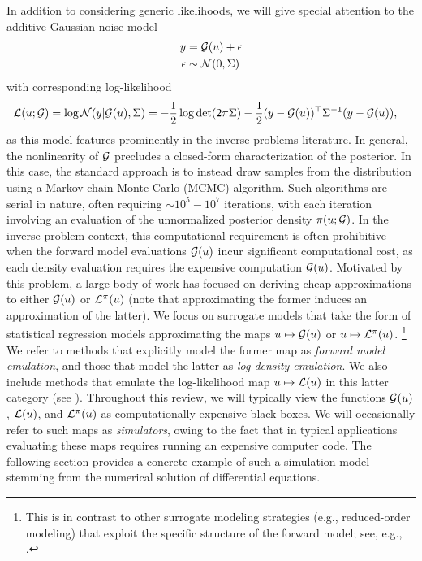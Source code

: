 \documentclass[12pt]{article}
\begin{document}
In addition to considering 
generic likelihoods, we will give special attention to the additive Gaussian noise model
\begin{align}
y &= \mathcal{G}(u) + \epsilon \label{inv_prob_Gaussian} \\
\epsilon &\sim \mathcal{N}(0, \Sigma) \nonumber 
\end{align}
with corresponding log-likelihood 
\begin{align}
\mathcal{L}(u; \mathcal{G}) &= \log\mathcal{N}(y| \mathcal{G}(u), \Sigma) 
= -\frac{1}{2} \log\det (2\pi \Sigma) - \frac{1}{2} (y - \mathcal{G}(u))^\top \Sigma^{-1} (y - \mathcal{G}(u)), \label{llik_Gaussian}
\end{align}
as this model features prominently in the inverse problems literature.
In general, the nonlinearity of $\mathcal{G}$ precludes a closed-form characterization of the posterior. In this case, the 
standard approach is to instead draw samples from the distribution using a Markov chain Monte Carlo (MCMC) 
algorithm. Such algorithms are serial in nature, often requiring $\sim 10^5 - 10^7$ iterations, with each 
iteration involving an evaluation of the unnormalized posterior density $\pi(u; \mathcal{G})$. 
In the inverse problem context, this computational requirement is often prohibitive when the forward model 
evaluations $\mathcal{G}(u)$ incur significant computational cost, as each density evaluation requires the 
expensive computation $\mathcal{G}(u)$. Motivated by this problem, a large body of work has focused on deriving 
cheap approximations to either $\mathcal{G}(u)$ or $\mathcal{L}^{\pi}(u)$ (note that approximating the former induces 
an approximation of the latter). We focus on surrogate models that take the form of statistical 
regression models approximating the maps $u \mapsto \mathcal{G}(u)$ or $u \mapsto \mathcal{L}^{\pi}(u)$.
\footnote{This is in contrast to other surrogate modeling strategies (e.g., reduced-order modeling)
that exploit the specific structure of the forward model; see, e.g., \todo.}
We refer to methods that explicitly model the former map as \textit{forward model emulation}, and those that 
model the latter as \textit{log-density emulation}. We also include methods that emulate the log-likelihood
map $u \mapsto \mathcal{L}(u)$ in this latter category (see ).
Throughout this review, we will typically view the functions
$\mathcal{G}(u)$, $\mathcal{L}(u)$, and $\mathcal{L}^{\pi}(u)$ as computationally expensive black-boxes. We will occasionally refer to 
such maps as \textit{simulators}, owing to the fact that in typical applications evaluating these maps requires
running an expensive computer code. The following section provides a concrete example of such a simulation
model stemming from the numerical solution of differential equations.


 
% 
\end{document}
